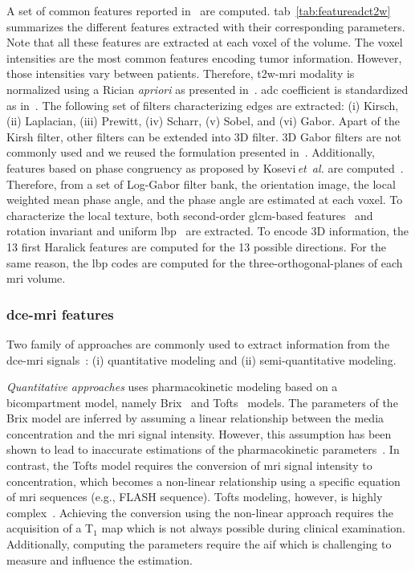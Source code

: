\documentclass[final,3p,times,twocolumn]{elsarticle}
\begin{document}
A set of common features reported in~\cite{lemaitre2015computer} are
computed. \Acl{tab}~\ref{tab:featureadct2w} summarizes the different features
extracted with their corresponding parameters. Note that all these features are
extracted at each voxel of the volume. The voxel intensities are the most
common features encoding tumor information. However, those intensities vary
between patients. Therefore, \ac{t2w}-\ac{mri} modality is normalized using a
Rician \emph{apriori} as presented
in~\cite{lemaitre2016normalization}. \Ac{adc} coefficient is standardized as
in~\cite{Nyul1999}. The following set of filters characterizing edges are
extracted: (i) Kirsch, (ii) Laplacian, (iii) Prewitt, (iv) Scharr, (v) Sobel,
and (vi) Gabor. Apart of the Kirsh filter, other filters can be extended into
3D filter. 3D Gabor filters are not commonly used and we reused the formulation
presented in~\cite{wang2005face}. Additionally, features based on phase
congruency as proposed by Kosevi\,\emph{et~al.} are
computed~\cite{kovesi1999image}. Therefore, from a set of Log-Gabor filter
bank, the orientation image, the local weighted mean phase angle, and the phase
angle are estimated at each voxel. To characterize the local texture, both
second-order \ac{glcm}-based features~\cite{Haralick1973} and rotation
invariant and uniform \ac{lbp}~\cite{ojala2002multiresolution} are
extracted. To encode 3D information, the 13 first Haralick features are
computed for the 13 possible directions. For the same reason, the \ac{lbp}
codes are computed for the three-orthogonal-planes of each \ac{mri} volume.

\subsubsection{\acs*{dce}-\acs*{mri} features}\label{features:dce}

Two family of approaches are commonly used to extract information from the
\ac{dce}-\ac{mri} signals~\cite{lemaitre2015computer}: (i) quantitative
modeling and (ii) semi-quantitative modeling. 

\emph{Quantitative approaches} uses pharmacokinetic modeling based on a
bicompartment model, namely Brix~\cite{brix1991pharmacokinetic} and
Tofts~\cite{tofts1995quantitative} models. The parameters of the Brix model
are inferred by assuming a linear relationship between the media concentration
and the \ac{mri} signal intensity. However, this assumption has been shown to
lead to inaccurate estimations of the pharmacokinetic
parameters~\cite{heilmann2006determination}. In contrast, the Tofts model
requires the conversion of \ac{mri} signal intensity to concentration, which
becomes a non-linear relationship using a specific equation of \ac{mri}
sequences (e.g., FLASH sequence). Tofts modeling, however, is highly
complex~\cite{gliozzi2011phenomenological}. Achieving the conversion using the
non-linear approach requires the acquisition of a T$_1$ map which is not always
possible during clinical examination. Additionally, computing the parameters
require the \ac{aif} which is challenging to measure and influence the estimation.
\end{document}
